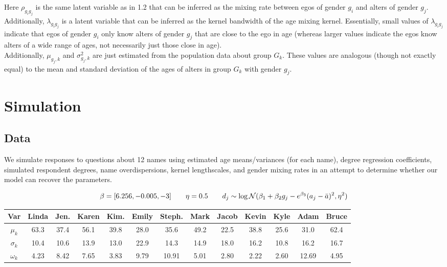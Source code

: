 \documentclass[12pt]{article}
\begin{document}
\noindent Here $\rho_{g_ig_j}$ is the same latent variable as in 1.2 that can be inferred as the mixing rate between egos of gender $g_i$ and alters of gender $g_j$. Additionally, $\lambda_{g_ig_j}$ is a latent variable that can be inferred as the kernel bandwidth of the age mixing kernel. Essentially, small values of $\lambda_{g_ig_j}$ indicate that egos of gender $g_i$ only know alters of gender $g_j$ that are close to the ego in age (whereas larger values indicate the egos know alters of a wide range of ages, not necessarily just those close in age).\\

\noindent Additionally, $\mu_{g_j,k}$ and $\sigma_{g_j,k}^2$ are just estimated from the population data about group $G_k$. These values are analogous (though not exactly equal) to the mean and standard deviation of the ages of alters in group $G_k$ with gender $g_j$.


\pagebreak
\section{Simulation}
\subsection{Data}
We simulate responses to questions about 12 names using estimated age means/variances (for each name), degree regression coefficients, simulated respondent degrees, name overdispersions, kernel lengthscales, and gender mixing rates in an attempt to determine whether our model can recover the parameters. 

$$
\beta = [6.256, -0.005, -3] 
\hspace{20 pt}
\eta = 0.5 
\hspace{20 pt}
d_j \sim \log\mathcal{N}(\beta_1 + \beta_2 g_j - e^{\beta_3} (a_j - \bar{a})^2, \eta^2)
$$

\noindent \begin{tabular}{c | cccccccccccc} 
Var & Linda & Jen. & Karen & Kim. & Emily & Steph. & Mark & Jacob & Kevin & Kyle & Adam & Bruce \\
\hline
$\mu_k$ & 63.3 & 37.4 & 56.1 & 39.8 & 28.0 & 35.6 & 49.2 & 22.5 & 38.8  & 25.6 & 31.0 & 62.4 \\
$\sigma_k$ & 10.4 & 10.6 & 13.9 & 13.0 & 22.9 & 14.3 & 14.9 & 18.0 & 16.2 & 10.8 & 16.2 & 16.7  \\
$\omega_k$ & 4.23 & 8.42 & 7.65 & 3.83 & 9.79 & 10.91 & 5.01 & 2.80 & 2.22 & 2.60 & 12.69 & 4.95  \\
\end{tabular}\\
\end{document}
